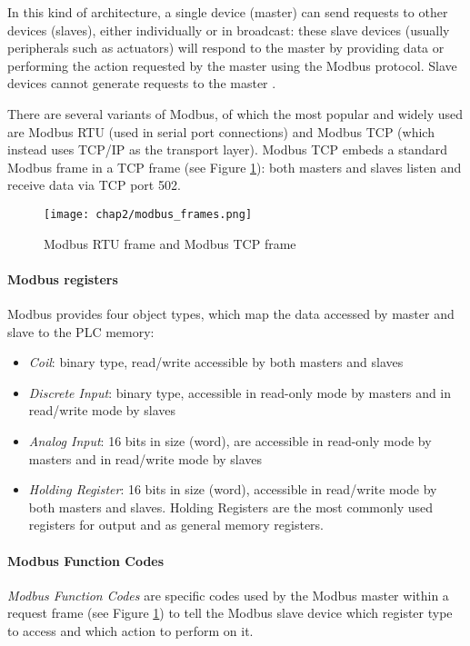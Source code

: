 In this kind of architecture, a single device (master) can send requests to other devices (slaves), either individually or in broadcast: these slave devices (usually peripherals such as actuators) will respond to the master by providing data or performing the action requested by the master using the Modbus protocol. Slave devices cannot generate requests to the master \cite{Modbus_rr}.

\bigskip
There are several variants of Modbus, of which the most popular and widely used are Modbus RTU (used in serial port connections) and Modbus TCP (which instead uses TCP/IP as the transport layer).
Modbus TCP embeds a standard Modbus frame in a TCP frame (see Figure \ref{fig:modbus_frames}): both masters and slaves listen and receive data via TCP port 502.

\begin{figure}[ht]
	\centering
	\texttt{[image: chap2/modbus\_frames.png]}
	\caption{Modbus RTU frame and Modbus TCP frame}
	\label{fig:modbus_frames}
\end{figure}

\paragraph{Modbus registers}
\label{subsub:modbus_registers}
Modbus provides four object types, which map the data accessed by master and slave to the PLC memory:

\begin{itemize}
	\item \textit{Coil}: binary type, read/write accessible by both masters and slaves
	\item \textit{Discrete Input}: binary type, accessible in read-only mode by masters and in read/write mode by slaves
	\item \textit{Analog Input}: 16 bits in size (word), are accessible in read-only mode by masters and in read/write mode by slaves
	\item \textit{Holding Register}:  16 bits in size (word), accessible in read/write mode by both masters and slaves. Holding Registers are the most commonly used registers for output and as general memory registers.
\end{itemize}

\paragraph{Modbus Function Codes}
\label{subsub:modbus_func_codes}
\textit{Modbus Function Codes} are specific codes used by the Modbus master within a request frame (see Figure \ref{fig:modbus_frames}) to tell the Modbus slave device which register type to access and which action to perform on it.

